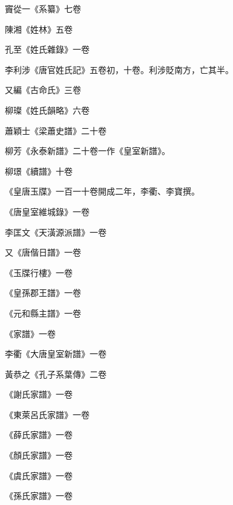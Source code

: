 \begin{pinyinscope}
 竇從一《系纂》七卷



 陳湘《姓林》五卷



 孔至《姓氏雜錄》一卷



 李利涉《唐官姓氏記》五卷初，十卷。利涉貶南方，亡其半。



 又編《古命氏》三卷



 柳璨《姓氏韻略》六卷



 蕭穎士《梁蕭史譜》二十卷



 柳芳《永泰新譜》二十卷一作《皇室新譜》。



 柳璟《續譜》十卷



 《皇唐玉牒》一百一十卷開成二年，李衢、李寶撰。



 《唐皇室維城錄》一卷



 李匡文《天潢源派譜》一卷



 又《唐偕日譜》一卷



 《玉牒行樓》一卷



 《皇孫郡王譜》一卷



 《元和縣主譜》一卷



 《家譜》一卷



 李衢《大唐皇室新譜》一卷



 黃恭之《孔子系葉傳》二卷



 《謝氏家譜》一卷



 《東萊呂氏家譜》一卷



 《薛氏家譜》一卷



 《顏氏家譜》一卷



 《虞氏家譜》一卷



 《孫氏家譜》一卷




\end{pinyinscope}
